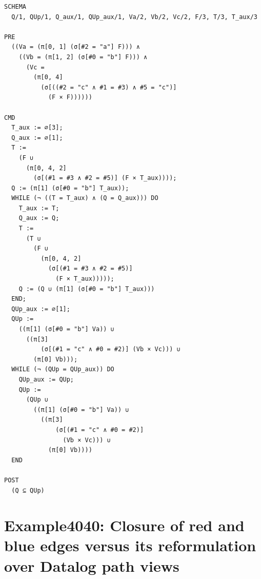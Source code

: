 \documentclass[10pt]{article}
\begin{document}
\begin{Verbatim}[fontsize=\tiny,breaklines=true,breakanywhere=true,frame=single,framesep=1.5mm]
SCHEMA
  Q/1, QUp/1, Q_aux/1, QUp_aux/1, Va/2, Vb/2, Vc/2, F/3, T/3, T_aux/3

PRE
  ((Va = (π[0, 1] (σ[#2 = "a"] F))) ∧
    ((Vb = (π[1, 2] (σ[#0 = "b"] F))) ∧
      (Vc =
        (π[0, 4]
          (σ[((#2 = "c" ∧ #1 = #3) ∧ #5 = "c")]
            (F × F))))))

CMD
  T_aux := ∅[3];
  Q_aux := ∅[1];
  T :=
    (F ∪
      (π[0, 4, 2]
        (σ[(#1 = #3 ∧ #2 = #5)] (F × T_aux))));
  Q := (π[1] (σ[#0 = "b"] T_aux));
  WHILE (¬ ((T = T_aux) ∧ (Q = Q_aux))) DO
    T_aux := T;
    Q_aux := Q;
    T :=
      (T ∪
        (F ∪
          (π[0, 4, 2]
            (σ[(#1 = #3 ∧ #2 = #5)]
              (F × T_aux)))));
    Q := (Q ∪ (π[1] (σ[#0 = "b"] T_aux)))
  END;
  QUp_aux := ∅[1];
  QUp :=
    ((π[1] (σ[#0 = "b"] Va)) ∪
      ((π[3]
          (σ[(#1 = "c" ∧ #0 = #2)] (Vb × Vc))) ∪
        (π[0] Vb)));
  WHILE (¬ (QUp = QUp_aux)) DO
    QUp_aux := QUp;
    QUp :=
      (QUp ∪
        ((π[1] (σ[#0 = "b"] Va)) ∪
          ((π[3]
              (σ[(#1 = "c" ∧ #0 = #2)]
                (Vb × Vc))) ∪
            (π[0] Vb))))
  END

POST
  (Q ⊆ QUp)
\end{Verbatim}

\Needspace{0.45\textheight}

\section{Example4040: Closure of red and blue edges versus its reformulation over Datalog path views}\label{case:Example4040}
\end{document}
